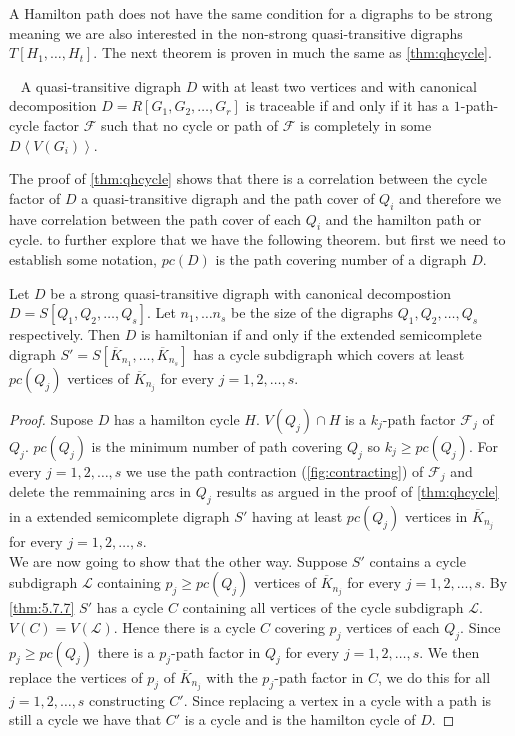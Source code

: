 A Hamilton path does not have the same condition for a digraphs to be strong meaning we are also interested in the non-strong quasi-transitive digraphs $T[H_1,\dots ,H_t]$. 
The next theorem is proven in much the same as \autoref{thm:qhcycle}. 
\begin{thm}~\cite{bangJGT20}
    A quasi-transitive digraph $D$ with at least two vertices and with canonical decomposition $D=R[G_1,G_2,\dots , G_r]$ is traceable if and only if it has a $1$-path-cycle factor $\mathcal{F}$ such that no cycle or path of $\mathcal{F}$ is completely in some $D\left< V(G_i)\right>$.
\end{thm}
The proof of \autoref{thm:qhcycle} shows that there is a correlation between the cycle factor of $D$ a quasi-transitive digraph and the path cover of $Q_i$ and therefore we have correlation between the path cover of each $Q_i$ and the hamilton path or cycle. to further explore that we have the following theorem.
but first we need to establish some notation, $pc(D)$ is the path covering number of a digraph $D$. 
\begin{thm}
    Let $D$ be a strong quasi-transitive digraph with canonical decompostion $D=S[Q_1,Q_2,\dots,Q_s]$.
    Let $n_1,\dots n_s$ be the size of the digraphs $Q_1,Q_2,\dots ,Q_s$ respectively. 
    Then $D$ is hamiltonian if and only if the extended semicomplete digraph $S'=S[\overline{K}_{n_1},\dots ,\overline{K}_{n_s}]$ has a cycle subdigraph which covers at least $pc(Q_j)$ vertices of $\overline{K}_{n_j}$ for every $j=1,2,\dots , s$.
\end{thm}
\begin{proof}
    Supose $D$ has a hamilton cycle $H$.
    $V(Q_j)\cap H$ is a $k_j$-path factor $\mathcal{F}_j$ of $Q_j$. 
    $pc(Q_j)$ is the minimum number of path covering $Q_j$ so $k_j\geq pc(Q_j)$. 
    For every $j=1,2,\dots ,s$ we use the path contraction (\autoref{fig:contracting}) of $\mathcal{F}_j$ and delete the remmaining arcs in $Q_j$ results as argued in the proof of \autoref{thm:qhcycle} in a extended semicomplete digraph $S'$ having at least $pc(Q_j)$ vertices in $\overline{K}_{n_j}$ for every $j=1,2,\dots ,s$.\\
    We are now going to show that the other way.
    Suppose $S'$ contains a cycle subdigraph $\mathcal{L}$ containing $p_j\geq pc(Q_j)$ vertices of $\overline{K}_{n_j}$ for every $j=1,2,\dots ,s$.
    By \autoref{thm:5.7.7} $S'$ has a cycle $C$ containing all vertices of the cycle subdigraph $\mathcal{L}$. $V(C)=V(\mathcal{L})$. 
    Hence there is a cycle $C$ covering $p_j$ vertices of each $Q_j$. Since $p_j\geq pc(Q_j)$ there is a $p_j$-path factor in $Q_j$ for every $j=1,2,\dots ,s$.
    We then replace the vertices of $p_j$ of $\overline{K}_{n_j}$ with the $p_j$-path factor in $C$, we do this for all $j=1,2,\dots ,s$ constructing $C'$. Since replacing a vertex in a cycle with a path is still a cycle we have that $C'$ is a cycle and is the hamilton cycle of $D$. 
\end{proof}

